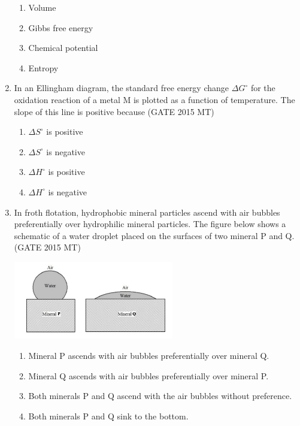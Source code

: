 \documentclass[12pt]{article}
\begin{document}
\begin{enumerate}
\vspace{0.5em}
\begin{enumerate}[label=(\alph*)]
    \item Volume
    \item Gibbs free energy
    \item Chemical potential
    \item Entropy
\end{enumerate}
\vspace{0.5em}

\item In an Ellingham diagram, the standard free energy change $\Delta G^\circ$ for the oxidation reaction of a metal M is plotted as a function of temperature. The slope of this line is positive because (GATE 2015 MT)

\vspace{0.5em}
\begin{enumerate}[label=(\alph*)]
    \item $\Delta S^\circ$ is positive
    \item $\Delta S^\circ$ is negative
    \item $\Delta H^\circ$ is positive
    \item $\Delta H^\circ$ is negative
\end{enumerate}
\vspace{0.5em}

\item In froth flotation, hydrophobic mineral particles ascend with air bubbles preferentially over hydrophilic mineral particles. The figure below shows a schematic of a water droplet placed on the surfaces of two mineral P and Q. (GATE 2015 MT)

\vspace{0.5em}
\begin{center}
    \includegraphics[width=0.55\textwidth]{images/q16i.jpg}
\end{center}
\begin{enumerate}[label=(\alph*)]
    \item Mineral P ascends with air bubbles preferentially over mineral Q.
    \item Mineral Q ascends with air bubbles preferentially over mineral P.
    \item Both minerals P and Q ascend with the air bubbles without preference.
    \item Both minerals P and Q sink to the bottom.
\end{enumerate}
\vspace{0.5em}


\end{enumerate}
\end{document}
